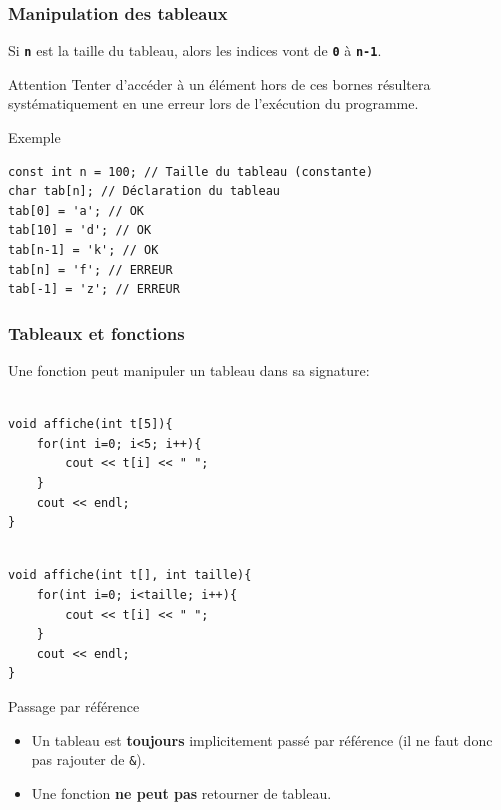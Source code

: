 \begin{frame}[fragile=singleslide]
    \frametitle{Manipulation des tableaux}
    Si \texttt{\textbf{n}} est la taille du tableau, alors les indices vont de \texttt{\textbf{0}} à \texttt{\textbf{n-1}}.
    
    \begin{alertblock}{Attention}
    Tenter d'accéder à un élément hors de ces bornes résultera systématiquement en une erreur lors de l'exécution du programme.
    \end{alertblock}
	
    \begin{exampleblock}{Exemple}
	\begin{verbatim}
const int n = 100; // Taille du tableau (constante)
char tab[n]; // Déclaration du tableau
tab[0] = 'a'; // OK
tab[10] = 'd'; // OK
tab[n-1] = 'k'; // OK
tab[n] = 'f'; // ERREUR
tab[-1] = 'z'; // ERREUR
	\end{verbatim}
    \end{exampleblock}
\end{frame}

\begin{frame}[fragile=singleslide]
\frametitle{Tableaux et fonctions}

Une fonction peut manipuler un tableau dans sa signature:

\begin{minipage}{0.47\linewidth}
\begin{verbatim}

void affiche(int t[5]){
    for(int i=0; i<5; i++){
    	cout << t[i] << " ";
    }
    cout << endl;
}

\end{verbatim}
\end{minipage}
\hfill
\begin{minipage}{0.52\linewidth}
\begin{verbatim}

void affiche(int t[], int taille){
    for(int i=0; i<taille; i++){
    	cout << t[i] << " ";
    }
    cout << endl;
}

\end{verbatim}
\end{minipage}

\begin{alertblock}{Passage par référence}
\begin{itemize}
\item Un tableau est \textbf{toujours} implicitement passé par référence (il ne faut donc pas rajouter de \texttt{\&}).
\item Une fonction \textbf{ne peut pas} retourner de tableau.
\end{itemize}
\end{alertblock}
\end{frame}

